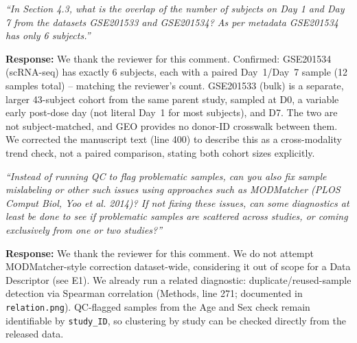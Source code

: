 \documentclass[11pt]{article}
\newcommand{\origcomment}[1]{\textit{``#1''}}
\newcommand{\filledresponse}[1]{%
  \par\medskip\noindent\textbf{Response:} #1\par
  \vspace{0.4cm}%
  \par\noindent\hrulefill\par\bigskip
}
\begin{document}
\begin{commentlist}
\item[R2-m9.] \origcomment{In Section 4.3, what is the overlap of the number of subjects on Day 1
and Day 7 from the datasets GSE201533 and GSE201534? As per metadata GSE201534 has only 6
subjects.}
\filledresponse{We thank the reviewer for this comment. Confirmed: GSE201534 (scRNA-seq) has
exactly 6 subjects, each with a paired Day~1/Day~7 sample (12 samples total) -- matching the
reviewer's count. GSE201533 (bulk) is a separate, larger 43-subject cohort from the same parent
study, sampled at D0, a variable early post-dose day (not literal Day~1 for most subjects), and D7.
The two are not subject-matched, and GEO provides no donor-ID crosswalk between them. We corrected
the manuscript text (line 400) to describe this as a cross-modality trend check, not a paired
comparison, stating both cohort sizes explicitly.}

\item[R2-m10.] \origcomment{Instead of running QC to flag problematic samples, can you also fix
sample mislabeling or other such issues using approaches such as MODMatcher (PLOS Comput Biol,
Yoo et al. 2014)? If not fixing these issues, can some diagnostics at least be done to see if
problematic samples are scattered across studies, or coming exclusively from one or two studies?}
\filledresponse{We thank the reviewer for this comment. We do not attempt MODMatcher-style
correction dataset-wide, considering it out of scope for a Data Descriptor (see E1). We already
run a related diagnostic: duplicate/reused-sample detection via Spearman correlation (Methods,
line 271; documented in \texttt{relation.png}). QC-flagged samples from the Age and Sex check
remain identifiable by \texttt{study\_ID}, so clustering by study can be checked directly from the
released data.}


\end{commentlist}
\end{document}
